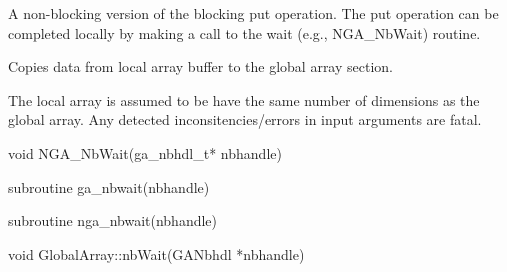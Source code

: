 \documentclass[12pt]{article}
\begin{document}
\ncoll

\begin{desc}
A non-blocking version of the blocking put operation. The put operation can be
completed locally by making a call to the wait (e.g., NGA_NbWait) routine.

Copies data from local array buffer to the global array section.

The local array is assumed to be have the same number of dimensions as the
global array. Any detected inconsitencies/errors in input arguments are fatal.
\end{desc}



\begin{capi}
\begin{ccode}
void NGA_NbWait(ga_nbhdl_t* nbhandle)
\end{ccode}
\begin{funcargs}
\end{funcargs}
\end{capi}

\begin{fapi}
\begin{fcode}
subroutine ga_nbwait(nbhandle)
\end{fcode}
\begin{funcargs}
\end{funcargs}
\end{fapi}

\begin{fapi}
\begin{fcode}
subroutine nga_nbwait(nbhandle)
\end{fcode}
\begin{funcargs}
\end{funcargs}
\end{fapi}

\begin{cxxapi}
\begin{cxxcode}
void GlobalArray::nbWait(GANbhdl *nbhandle)
\end{cxxcode}
\begin{funcargs}
\end{funcargs}
\end{cxxapi}
\end{document}

